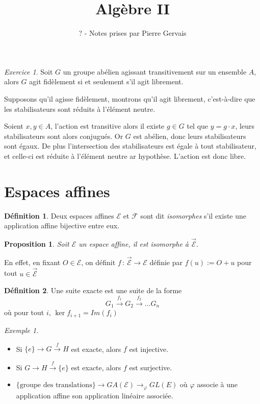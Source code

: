 \documentclass[]{article}
\title{Algèbre II}
\author{? - Notes prises par Pierre Gervais}
\newtheorem{myproposition}{Proposition}
\theoremstyle{remark}
\newtheorem{myexer}{Exercice}
\newtheorem{myexmpl}{Exemple}
\theoremstyle{definition}
\newtheorem{mydef}{Définition}
\newcommand{\funcshort}[3]{
	#1 \, : \, #2 \longrightarrow #3
}
\begin{document}
\maketitle

\tableofcontents

\newpage

\begin{myexer}
	Soit $G$ un groupe abélien agissant transitivement sur un ensemble $A$, alors $G$ agit fidèlement si et seulement s'il agit librement.
	
	Supposons qu'il agisse fidèlement, montrons qu'il agit librement, c'est-à-dire que les stabilisateurs sont réduits à l'élément neutre.
	
	Soient $x, y \in A$, l'action est transitive alors il existe $g \in G$ tel que $y = g \cdot x$, leurs stabilisateurs sont alors conjugués. Or $G$ est abélien, donc leurs stabilisateurs sont égaux. De plus l'intersection des stabilisateurs est égale à tout stabilisateur, et celle-ci est réduite à l'élément neutre ar hypothèse. L'action est donc libre.
\end{myexer}

\section{Espaces affines}

\begin{mydef}
	Deux espaces affines $\mathcal{E}$ et $\mathcal{F}$ sont dit \textit{isomorphes} s'il existe une application affine bijective entre eux.
\end{mydef}

\begin{myproposition}
	Soit $\mathcal{E}$ un espace affine, il est isomorphe à $\overrightarrow{\mathcal{E}}$.
\end{myproposition}

En effet, en fixant $O \in \mathcal{E}$, on définit $\funcshort{f}{\overrightarrow{\mathcal{E}}}{\mathcal{E}}$ définie par $f(u) := O + u$ pour tout $u \in \overrightarrow{\mathcal{E}}$

\begin{mydef}
	Une suite exacte est une suite de la forme
	$$G_1 \xrightarrow{f_1} G_2 \xrightarrow{f_2} ... G_n$$
	où pour tout $i$, $\ker f_{i+1} = Im (f_i)$
\end{mydef}

\begin{myexmpl}
	\begin{itemize}
		
		\item Si $\{e\} \rightarrow G \xrightarrow{f} H$ est exacte, alors $f$ est injective.
	
		\item Si $G \rightarrow H \xrightarrow{f} \{e\}$ est exacte, alors $f$ est surjective.

		\item $\{\text{groupe des translations}\} \rightarrow GA(\mathcal{E}) \rightarrow_\varphi GL(E)$ où $\varphi$ associe à une application affine son application linéaire associée.
	\end{itemize}
\end{myexmpl}
\end{document}
